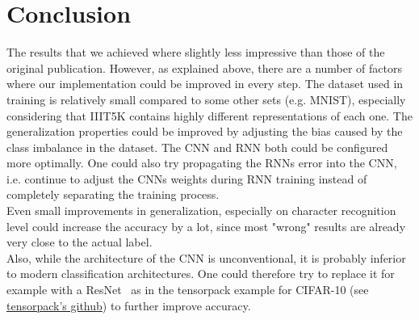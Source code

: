 \documentclass{utue} %
\begin{document}
\section{Conclusion}
The results that we achieved where slightly less impressive than those of the original publication. However, as explained above, there are a number of factors where our implementation could be improved in every step. The dataset used in training is relatively small compared to some other sets (e.g. MNIST), especially considering that IIIT5K contains highly different representations of each one. The generalization properties could be improved by adjusting the bias caused by the class imbalance in the dataset. The CNN and RNN both could be configured more optimally. One could also try propagating the RNNs error into the CNN, i.e. continue to adjust the CNNs weights during RNN training instead of completely separating the training process.\\
Even small improvements in generalization, especially on character recognition level could increase the accuracy by a lot, since most "wrong" results are already very close to the actual label.\\
Also, while the architecture of the CNN is unconventional, it is probably inferior to modern classification architectures. One could therefore try to replace it for example with a ResNet~\cite{resnet} as in the tensorpack example for CIFAR-10 (see \href{https://github.com/ppwwyyxx/tensorpack/blob/master/examples/ResNet/cifar10-resnet.py}{tensorpack's github}) to further improve accuracy.
\end{document}

